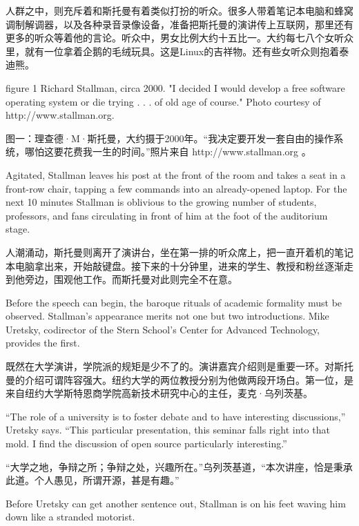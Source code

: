 \ifdefined\chs
人群之中，则充斥着和斯托曼有着类似打扮的听众。很多人带着笔记本电脑和蜂窝调制解调器，以及各种录音录像设备，准备把斯托曼的演讲传上互联网，那里还有更多的听众等着他的言论。听众中，男女比例大约十五比一。大约每七八个女听众里，就有一位拿着企鹅的毛绒玩具。这是Linux的吉祥物。还有些女听众则抱着泰迪熊。
\fi

\ifdefined\eng
figure 1
Richard Stallman, circa 2000. "I decided I would develop a free software operating system or die trying . . . of old age of course." Photo courtesy of http://www.stallman.org.
\fi

\ifdefined\chs
图一：理查德·M·斯托曼，大约摄于2000年。“我决定要开发一套自由的操作系统，哪怕这要花费我一生的时间。”照片来自 http://www.stallman.org 。
\fi

\ifdefined\eng
Agitated, Stallman leaves his post at the front of the room and takes a seat in a front-row chair, tapping a few commands into an already-opened laptop. For the next 10 minutes Stallman is oblivious to the growing number of students, professors, and fans circulating in front of him at the foot of the auditorium stage.
\fi

\ifdefined\chs
人潮涌动，斯托曼则离开了演讲台，坐在第一排的听众席上，把一直开着机的笔记本电脑拿出来，开始敲键盘。接下来的十分钟里，进来的学生、教授和粉丝逐渐走到他旁边，围观他工作。而斯托曼对此则完全不在意。
\fi

\ifdefined\eng
Before the speech can begin, the baroque rituals of academic formality must be observed. Stallman's appearance merits not one but two introductions. Mike Uretsky, codirector of the Stern School's Center for Advanced Technology, provides the first.
\fi

\ifdefined\chs
既然在大学演讲，学院派的规矩是少不了的。演讲嘉宾介绍则是重要一环。对斯托曼的介绍可谓阵容强大。纽约大学的两位教授分别为他做两段开场白。第一位，是来自纽约大学斯特恩商学院高新技术研究中心的主任，麦克·乌列茨基。
\fi

\ifdefined\eng
``The role of a university is to foster debate and to have interesting discussions,'' Uretsky says. ``This particular presentation, this seminar falls right into that mold. I find the discussion of open source particularly interesting.''
\fi

\ifdefined\chs
``大学之地，争辩之所；争辩之处，兴趣所在。''乌列茨基道，``本次讲座，恰是秉承此道。个人愚见，所谓开源，甚是有趣。''
\fi

\ifdefined\eng
Before Uretsky can get another sentence out, Stallman is on his feet waving him down like a stranded motorist.
\fi

